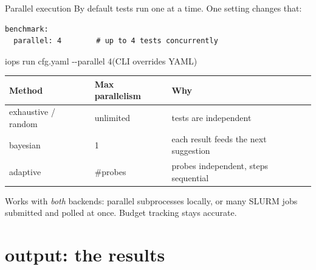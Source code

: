 \documentclass[aspectratio=169,11pt]{beamer}
\newcommand{\code}[1]{{\ttfamily\small\color{iopsNavy}#1}}
\begin{document}
\begin{frame}[fragile]{Parallel execution}
  By default tests run one at a time. One setting changes that:
\begin{lstlisting}[style=yaml]
benchmark:
  parallel: 4        # up to 4 tests concurrently
\end{lstlisting}
  \code{iops run cfg.yaml -{}-parallel 4}\quad (CLI overrides YAML)
  \vspace{0.5em}
  \begin{center}
  \begin{tabular}{@{}lll@{}}
    \toprule
    \textbf{Method} & \textbf{Max parallelism} & \textbf{Why} \\
    \midrule
    \code{exhaustive} / \code{random} & unlimited & tests are independent \\
    \code{bayesian}  & 1 & each result feeds the next suggestion \\
    \code{adaptive}  & \#probes & probes independent, steps sequential \\
    \bottomrule
  \end{tabular}
  \end{center}
  \vspace{0.4em}
  \begin{keybox}
    Works with \emph{both} backends: parallel subprocesses locally, or many
    SLURM jobs submitted and polled at once. Budget tracking stays accurate.
  \end{keybox}
\end{frame}

\section{output: the results}
\end{document}
